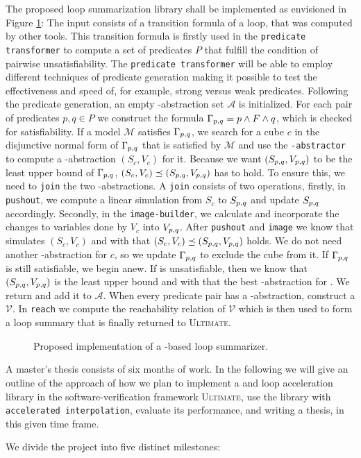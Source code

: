 
The proposed \qvasrs loop summarization library shall be implemented as envisioned in Figure \ref{fig}: The input consists of a transition formula of a loop, that was computed by other tools. This transition formula is firstly used in the \texttt{predicate transformer} to compute a set of predicates $P$ that fulfill the condition of pairwise unsatisfiability. The \texttt{predicate transformer} will be able to employ different techniques of predicate generation making it possible to test the effectiveness and speed of, for example, strong versus weak predicates. Following the predicate generation, an empty \qvasr-abstraction set $\mathcal{A}$ is initialized. For each pair of predicates $p, q \in P$ we construct the formula $\Gamma_{p, q} = p \land F \land q$, which is checked for satisfiability. If a model $\mathcal{M}$ satisfies $\Gamma_{p, q}$, we search for a cube $c$ in the disjunctive normal form of $\Gamma_{p, q}$ that is satisfied by $\mathcal{M}$ and use the \texttt{\qvasr-abstractor} to compute a \qvasr-abstraction $(S_c, V_c)$ for it. Because we want $(S_{p, q}, V_{p, q})$ to be the least upper bound of $\Gamma_{p, q}$, $(S_c, V_c) \preceq (S_{p, q}, V_{p, q})$ has to hold. To ensure this, we need to \texttt{join} the two \qvasr-abstractions. A \texttt{join} consists of two operations, firstly, in \texttt{pushout}, we compute a linear simulation from $S_c$ to $S_{p, q}$ and update $S_{p, q}$ accordingly. Secondly, in the \texttt{image-builder}, we calculate and incorporate the changes to variables done by $V_c$ into $V_{p, q}$. After \texttt{pushout} and \texttt{image} we know that \pqvasr simulates $(S_c, V_c)$ and with that $(S_c, V_c) \preceq (S_{p, q}, V_{p, q})$ holds. We do not need another \qvasr-abstraction for $c$, so we update $\Gamma_{p, q}$ to exclude the cube from it. If $\Gamma_{p, q}$ is still satisfiable, we begin anew.
If \pqformula is unsatisfiable, then we know that $(S_{p, q}, V_{p, q})$ is the least upper bound and with that the best \qvasr-abstraction for \pqformula. We return and add it to $\mathcal{A}$. When every predicate pair has a \qvasr-abstraction, construct a \qvasrs $\mathcal{V}$. In \texttt{reach} we compute the reachability relation of $\mathcal{V}$ which is then used to form a loop summary that is finally returned to \textsc{Ultimate}.
\begin{figure}[H]
    
    \caption{Proposed implementation of a \qvasrs-based loop summarizer.}
    \label{fig}
\end{figure}

A master's thesis consists of six months of work. In the following we will give an outline of the approach of how we plan to implement a \qvasr and \qvasrs loop acceleration library in the software-verification framework \textsc{Ultimate}, use the library with \texttt{accelerated interpolation}, evaluate its performance, and writing a thesis, in this given time frame. \\ \par
We divide the project into five distinct milestones:

